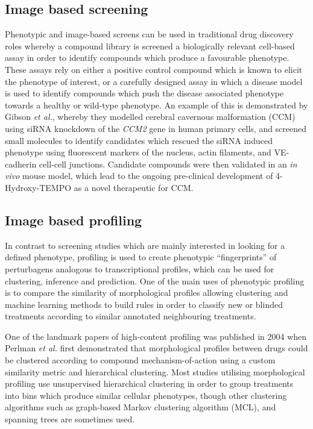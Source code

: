 \documentclass[a4paper,11pt,twoside,openright]{scrbook}
\begin{document}
\subsection{Image based screening}

Phenotypic and image-based screens can be used in traditional drug discovery roles whereby a compound library is screened a biologically relevant cell-based assay in order to identify compounds which produce a favourable phenotype.
These assays rely on either a positive control compound which is known to elicit the phenotype of interest, or a carefully designed assay in which a disease model is used to identify compounds which push the disease associated phenotype towards a healthy or wild-type phenotype.
An example of this is demonstrated by Gibson \textit{et al.}, \cite{Gibson2015} whereby they modelled cerebral cavernous malformation (CCM) using siRNA knockdown of the \textit{CCM2} gene in human primary cells, and screened small molecules to identify candidates which rescued the siRNA induced phenotype using fluorescent markers of the nucleus, actin filaments, and VE-cadherin cell-cell junctions.
Candidate compounds were then validated in an \textit{in vivo} mouse model, which lead to the ongoing pre-clinical development of 4-Hydroxy-TEMPO as a novel therapeutic for CCM.

\subsection{Image based profiling}
In contrast to screening studies which are mainly interested in looking for a defined phenotype, profiling is used to create phenotypic ``fingerprints'' of perturbagens analogous to transcriptional profiles, which can be used for clustering, inference and prediction.
One of the main uses of phenotypic profiling is to compare the similarity of morphological profiles allowing clustering and machine learning methods to build rules in order to classify new or blinded treatments according to similar annotated neighbouring treatments.

One of the landmark papers of high-content profiling was published in 2004 when Perlman \textit{et al.} \cite{Perlman2004} first demonstrated that morphological profiles between drugs could be clustered according to compound mechanism-of-action using a custom similarity metric and hierarchical clustering.
Most studies utilising morphological profiling use unsupervised hierarchical clustering in order to group treatments into bins which produce similar cellular phenotypes, \cite{Gustafsdottir2013,Young2008} though other clustering algorithms such as graph-based Markov clustering algorithm (MCL), \cite{Reisen2015,VanDongen2008} and spanning trees \cite{Qiu2011} are sometimes used.
\end{document}
